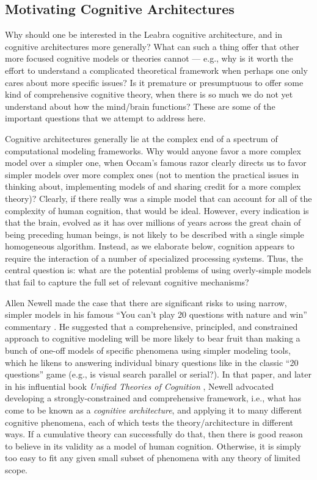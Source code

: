 \documentclass[11pt,twoside]{article}
\begin{document}
\subsection{Motivating Cognitive Architectures}

Why should one be interested in the Leabra cognitive architecture, and in
cognitive architectures more generally?  What can such a thing offer that
other more focused cognitive models or theories cannot --- e.g., why is it
worth the effort to understand a complicated theoretical framework when
perhaps one only cares about more specific issues?  Is it premature or
presumptuous to offer some kind of comprehensive cognitive theory, when there
is so much we do not yet understand about how the mind/brain functions?  These
are some of the important questions that we attempt to address here.

Cognitive architectures generally lie at the complex end of a spectrum of
computational modeling frameworks.  Why would anyone favor a more complex
model over a simpler one, when Occam's famous razor clearly directs us to
favor simpler models over more complex ones (not to mention the practical
issues in thinking about, implementing models of and sharing credit for a more
complex theory)?  Clearly, if there really was a simple model that can account
for all of the complexity of human cognition, that would be ideal.  However,
every indication is that the brain, evolved as it has over millions of years
across the great chain of being preceding human beings, is not likely to be
described with a single simple homogeneous algorithm.  Instead, as we
elaborate below, cognition appears to require the interaction of a number of
specialized processing systems.  Thus, the central question is: what are the
potential problems of using overly-simple models that fail to capture the full
set of relevant cognitive mechanisms?

Allen Newell made the case that there are significant risks to using narrow,
simpler models in his famous ``You can't play 20 questions with nature and
win'' commentary \cite{Newell73}.  He suggested that a comprehensive,
principled, and constrained approach to cognitive modeling will be more likely
to bear fruit than making a bunch of one-off models of specific phenomena
using simpler modeling tools, which he likens to answering individual binary
questions like in the classic ``20 questions'' game (e.g., is visual search
parallel or serial?).  In that paper, and later in his influential book {\em
  Unified Theories of Cognition} , Newell advocated
developing a strongly-constrained and comprehensive framework, i.e., what has
come to be known as a {\em cognitive architecture}, and applying it to many
different cognitive phenomena, each of which tests the theory/architecture in
different ways.  If a cumulative theory can successfully do that, then there
is good reason to believe in its validity as a model of human cognition.
Otherwise, it is simply too easy to fit any given small subset of phenomena
with any theory of limited scope.
\end{document}
